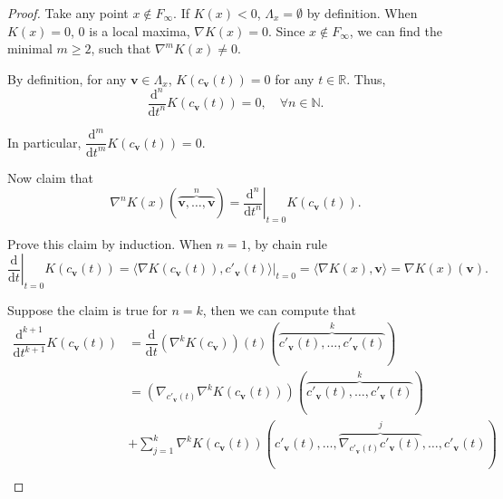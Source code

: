 \documentclass[10pt,a4paper]{amsart}
\begin{document}
\begin{proof}
	Take any point $x\notin F_{\infty}$. If $K(x)<0$, $\Lambda_{x}=\emptyset$ by definition. When $K(x)=0$, $0$ is a local maxima, $\nabla K(x)=0$. Since $x\notin F_{\infty}$, we can find the minimal $m\ge 2$, such that $\nabla^{m}K(x)\neq 0$.

	By definition, for any $\bm{v}\in \Lambda_{x}$, $K(c_{\bm{v}}(t))=0$ for any $t\in\mathbb{R}$. Thus,
	\begin{displaymath}
		\dfrac{\mathrm{d}^n}{\mathrm{d}t^{n}} K(c_{\bm{v}}(t))=0,\quad\forall n\in\mathbb{N}.
	\end{displaymath}

	In particular, $\dfrac{\mathrm{d}^{m}}{\mathrm{d}t^{m}} K(c_{\bm{v}}(t))=0$.

	Now claim that
	\begin{displaymath}
		\nabla^{n}K(x)(\overbrace{\bm{v},\ldots,\bm{v}}^{n})=\left.\dfrac{\mathrm{d}^{n}}{\mathrm{d}t^{n}}\right\rvert_{t=0}K(c_{\bm{v}}(t)).
	\end{displaymath}

	Prove this claim by induction. When $n=1$, by chain rule
	\begin{displaymath}
		\left.\dfrac{\mathrm{d}}{\mathrm{d}t}\right\rvert_{t=0}K(c_{\bm{v}}(t))=\langle \nabla K(c_{\bm{v}}(t)),c'_{\bm{v}}(t)\rangle\rvert_{t=0}=\langle \nabla K(x),\bm{v}\rangle=\nabla K(x)(\bm{v}).
	\end{displaymath}

	Suppose the claim is true for $n=k$, then we can compute that
	\begin{displaymath}
		\begin{aligned}
			\dfrac{\mathrm{d}^{k+1}}{\mathrm{d}t^{k+1}}K(c_{\bm{v}}(t)) & = \dfrac{\mathrm{d}}{\mathrm{d}t}(\nabla^{k} K(c_{\bm{v}}))(t)(\overbrace{c'_{\bm{v}}(t),\ldots,c'_{\bm{v}}(t)}^{k})                         \\
			                                                            & =(\nabla_{c'_{\bm{v}}(t)}\nabla^{k}K(c_{\bm{v}}(t)))(\overbrace{c'_{\bm{v}}(t),\ldots,c'_{\bm{v}}(t)}^{k})                                   \\
			                                                            & +\sum_{j=1}^k \nabla^{k}K(c_{\bm{v}}(t))(c'_{\bm{v}}(t),\ldots,\overbrace{\nabla_{c'_{\bm{v}}(t)}c'_{\bm{v}}(t)}^{j},\ldots, c'_{\bm{v}}(t)) \\
		\end{aligned}
	\end{displaymath}


\end{proof}
\end{document}
